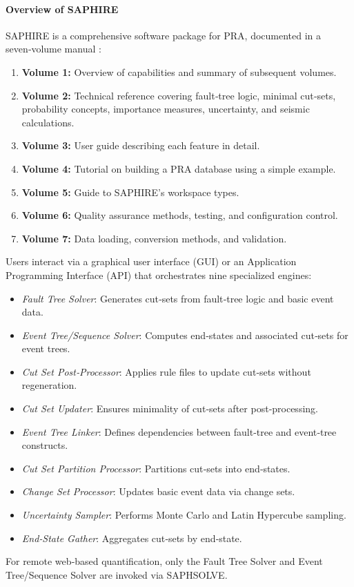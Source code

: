 \paragraph{Overview of SAPHIRE}
SAPHIRE is a comprehensive software package for PRA, documented in a seven‑volume manual \cite{24}:
\begin{enumerate}
  \item \textbf{Volume 1:} Overview of capabilities and summary of subsequent volumes.
  \item \textbf{Volume 2:} Technical reference covering fault‑tree logic, minimal cut‑sets, probability concepts, importance measures, uncertainty, and seismic calculations.
  \item \textbf{Volume 3:} User guide describing each feature in detail.
  \item \textbf{Volume 4:} Tutorial on building a PRA database using a simple example.
  \item \textbf{Volume 5:} Guide to SAPHIRE’s workspace types.
  \item \textbf{Volume 6:} Quality assurance methods, testing, and configuration control.
  \item \textbf{Volume 7:} Data loading, conversion methods, and validation.
\end{enumerate}
Users interact via a graphical user interface (GUI) or an Application Programming Interface (API) that orchestrates nine specialized engines:
\begin{itemize}
  \item \emph{Fault Tree Solver}: Generates cut‑sets from fault‑tree logic and basic event data.
  \item \emph{Event Tree/Sequence Solver}: Computes end‑states and associated cut‑sets for event trees.
  \item \emph{Cut Set Post‑Processor}: Applies rule files to update cut‑sets without regeneration.
  \item \emph{Cut Set Updater}: Ensures minimality of cut‑sets after post‑processing.
  \item \emph{Event Tree Linker}: Defines dependencies between fault‑tree and event‑tree constructs.
  \item \emph{Cut Set Partition Processor}: Partitions cut‑sets into end‑states.
  \item \emph{Change Set Processor}: Updates basic event data via change sets.
  \item \emph{Uncertainty Sampler}: Performs Monte Carlo and Latin Hypercube sampling.
  \item \emph{End‑State Gather}: Aggregates cut‑sets by end‑state.
\end{itemize}
For remote web‑based quantification, only the Fault Tree Solver and Event Tree/Sequence Solver are invoked via SAPHSOLVE.

